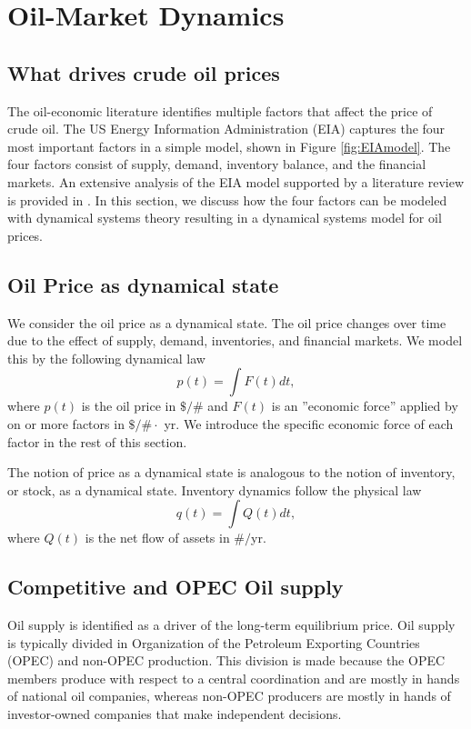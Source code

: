 \section{Oil-Market Dynamics}
\label{sec: EconEng}

\subsection{What drives crude oil prices}
The oil-economic literature identifies multiple factors that affect the price of crude oil.
The US Energy Information Administration (EIA) captures the four most important factors in a simple model, shown in Figure \ref{fig:EIAmodel}.
The four factors consist of supply, demand, inventory balance, and the financial markets.
An extensive analysis of the EIA model supported by a literature review is provided in \cite{LANG2020100914}.
In this section, we discuss how the four factors can be modeled with dynamical systems theory resulting in a dynamical systems model for oil prices.




\subsection{Oil Price as dynamical state}
We consider the oil price as a dynamical state.
The oil price changes over time due to the effect of supply, demand, inventories, and financial markets.
We model this by the following dynamical law
\begin{equation}
\label{eq: pdot}
    {p}(t) = \int F(t) dt,
\end{equation}
where $p(t)$ is  the oil price in $\$/\#$ and $F(t)$ is an ''economic force'' applied by on or more factors in $\$/\#\cdot$ yr.
We introduce the specific economic force of each factor in the rest of this section.

The notion of price as a dynamical state is analogous to the notion of inventory, or stock, as a dynamical state.
Inventory dynamics follow the physical law
\begin{equation}
    \label{eq: qdot}
 q(t) = \int Q (t) dt,
\end{equation}
where $Q(t)$ is the net flow of assets in $\#/$yr.


\subsection{Competitive and OPEC Oil supply}
Oil supply is identified as a driver of the long-term equilibrium price.
Oil supply is typically divided in Organization of the Petroleum Exporting Countries (OPEC) and non-OPEC production.
This division is made because the OPEC members produce with respect to a central coordination and are mostly in hands of national oil companies, whereas non-OPEC producers are mostly in hands of investor-owned companies that make independent decisions.

